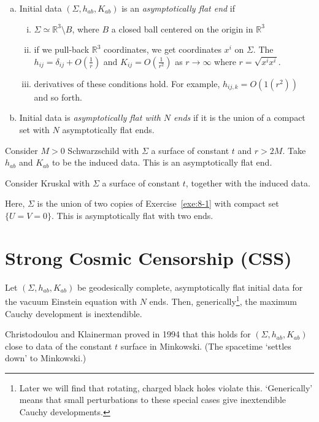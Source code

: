 \begin{definition}
  \begin{enumerate}[(a)]
    \item Initial data $(\Sigma, h_{ab}, K_{ab})$  is an \emph{asymptotically flat end} if 
      \begin{enumerate}[(i)]
        \item $\Sigma \simeq \mathbb{R}^3 \setminus B$, where $B$ a closed ball centered on the origin in $\mathbb{R}^3$
	\item if we pull-back $\mathbb{R}^3$ coordinates, we get coordinates $x^{i}$ on $\Sigma$. The $h_{ij} = \delta_{ij} + O(\frac{1}{r})$ and $K_{ij} = O(\frac{1}{r^2})$ as $r \to \infty$ where $r = \sqrt{x^{i} x^{i}}$.
	\item derivatives of these conditions hold. For example, $h_{ij,k} = O(1(r^2))$ and so forth.
      \end{enumerate}
    \item Initial data is \emph{asymptotically flat with $N$ ends} if it is the union of a compact set with $N$ asymptotically flat ends.
  \end{enumerate}
\end{definition}
\begin{exercise} \label{exe:8-1}
  Consider $M> 0$ Schwarzschild with $\Sigma$ a surface of constant $t$ and $r > 2M$.
  Take $h_{ab}$ and $K_{ab}$ to be the induced data.
  This is an asymptotically flat end.
\end{exercise}
\begin{example}
  Consider Kruskal with $\Sigma$ a surface of constant $t$, together with the induced data.
  \begin{figure}[tbhp]
    \centering
    \def\svgwidth{0.8\columnwidth}
    
    \caption{}
    \label{fig:l8f4}
  \end{figure}
  Here, $\Sigma$ is the union of two copies of Exercise~\ref{exe:8-1} with compact set $\{U = V = 0\}$.
  This is asymptotically flat with two ends.
\end{example}

\section{Strong Cosmic Censorship (CSS)}%
\label{sec:strong_cosmic_censorship_css_}

\begin{conjecture}
  Let $(\Sigma, h_{ab}, K_{ab})$ be geodesically complete, asymptotically flat initial data for the vacuum Einstein equation with $N$ ends.
  Then, generically\footnote{Later we will find that rotating, charged black holes violate this.
  `Generically' means that small perturbations to these special cases give inextendible Cauchy developments.}, the maximum Cauchy development is inextendible.
\end{conjecture}
Christodoulou and Klainerman proved  in 1994 that this holds for $(\Sigma, h_{ab}, K_{ab})$ close to data of the constant $t$ surface in Minkowski. (The spacetime `settles down' to Minkowski.)

